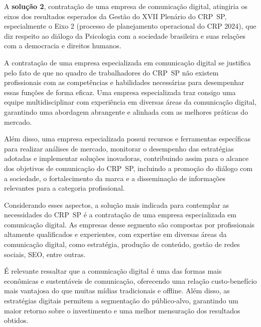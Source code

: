 \documentclass[oneside,a4paper,article]{memoir}
\begin{document}
A \textbf{solução 2}, contratação de uma empresa de comunicação digital,
atingiria os eixos dos resultados esperados da Gestão do XVII Plenário
do CRP~SP, especialmente o Eixo 2 (processo de planejamento operacional
do CRP 2024), que diz respeito ao diálogo da Psicologia com a sociedade
brasileira e suas relações com a democracia e direitos humanos.

A contratação de uma empresa especializada em comunicação digital se
justifica pelo fato de que no quadro de trabalhadores do CRP~SP não
existem profissionais com as competências e habilidades necessárias para
desempenhar essas funções de forma eficaz. Uma empresa especializada
traz consigo uma equipe multidisciplinar com experiência em diversas
áreas da comunicação digital, garantindo uma abordagem abrangente e
alinhada com as melhores práticas do mercado.

Além disso, uma empresa especializada possui recursos e ferramentas
específicas para realizar análises de mercado, monitorar o desempenho
das estratégias adotadas e implementar soluções inovadoras, contribuindo
assim para o alcance dos objetivos de comunicação do CRP~SP, incluindo a
promoção do diálogo com a sociedade, o fortalecimento da marca e a
disseminação de informações relevantes para a categoria profissional.

%
Considerando esses aspectos, a solução mais indicada para contemplar as
necessidades do CRP~SP é a contratação de uma empresa especializada em
comunicação digital. As empresas desse segmento são compostas por
profissionais altamente qualificados e experientes, com expertise em
diversas áreas da comunicação digital, como estratégia, produção de
conteúdo, gestão de redes sociais, SEO, entre outras.

É relevante ressaltar que a comunicação digital é uma das formas mais
econômicas e sustentáveis de comunicação, oferecendo uma relação
custo-benefício mais vantajosa do que muitas mídias tradicionais e
offline. Além disso, as estratégias digitais permitem a segmentação do
público-alvo, garantindo um maior retorno sobre o investimento e uma
melhor mensuração dos resultados obtidos.
\end{document}
